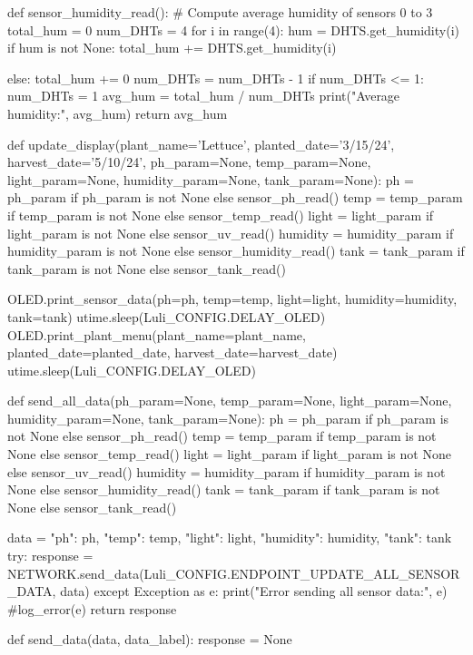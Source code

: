 \documentclass[12pt]{article} %
\begin{document}
\begin{pythoncode}[caption={Main MicroPython Code}]
def sensor_humidity_read():
    # Compute average humidity of sensors 0 to 3
    total_hum = 0
    num_DHTs = 4
    for i in range(4):
        hum = DHTS.get_humidity(i)
        if hum is not None:
            total_hum += DHTS.get_humidity(i)
            
        else:
            total_hum += 0
            num_DHTs = num_DHTs - 1
    if num_DHTs <= 1:
        num_DHTs = 1
    avg_hum = total_hum / num_DHTs
    print("Average humidity:", avg_hum)
    return avg_hum

def update_display(plant_name='Lettuce', planted_date='3/15/24', harvest_date='5/10/24', ph_param=None, temp_param=None, light_param=None, humidity_param=None, tank_param=None):
    ph = ph_param if ph_param is not None else sensor_ph_read()
    temp = temp_param if temp_param is not None else sensor_temp_read()
    light = light_param if light_param is not None else sensor_uv_read()
    humidity = humidity_param if humidity_param is not None else sensor_humidity_read()
    tank = tank_param if tank_param is not None else sensor_tank_read()

    OLED.print_sensor_data(ph=ph, temp=temp, light=light, humidity=humidity, tank=tank)
    utime.sleep(Luli_CONFIG.DELAY_OLED)
    OLED.print_plant_menu(plant_name=plant_name, planted_date=planted_date, harvest_date=harvest_date)
    utime.sleep(Luli_CONFIG.DELAY_OLED)

def send_all_data(ph_param=None, temp_param=None, light_param=None, humidity_param=None, tank_param=None):
    ph = ph_param if ph_param is not None else sensor_ph_read()
    temp = temp_param if temp_param is not None else sensor_temp_read()
    light = light_param if light_param is not None else sensor_uv_read()
    humidity = humidity_param if humidity_param is not None else sensor_humidity_read()
    tank = tank_param if tank_param is not None else sensor_tank_read()


    data = {
        "ph": ph,
        "temp": temp,
        "light": light,
        "humidity": humidity,
        "tank": tank
    }
    try:
        response = NETWORK.send_data(Luli_CONFIG.ENDPOINT_UPDATE_ALL_SENSOR_DATA, data)
    except Exception as e:
        print("Error sending all sensor data:", e)
        #log_error(e)
    return response

def send_data(data, data_label):
    response = None
    

\end{pythoncode}
\end{document}
